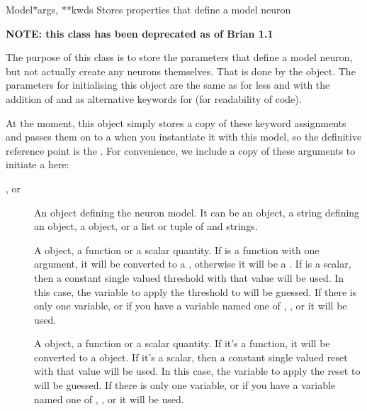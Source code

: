 \documentclass[letterpaper,10pt,english]{manual}
\begin{document}
\hypertarget{brian.Model}{}\begin{classdesc}{Model}{*args, **kwds}
Stores properties that define a model neuron

\textbf{NOTE: this class has been deprecated as of Brian 1.1}

The purpose of this class is to store the parameters that define
a model neuron, but not actually create any neurons themselves. That is
done by the \hyperlink{brian.NeuronGroup}{} object. The parameters for initialising
this object are the same as for \hyperlink{brian.NeuronGroup}{} less  and
with the addition of  and  as
alternative keywords for  (for readability of code).

At the moment, this object simply stores a copy of these keyword
assignments and passes them on to a \hyperlink{brian.NeuronGroup}{} when you
instantiate it with this model, so the definitive reference point is
the \hyperlink{brian.NeuronGroup}{}. For convenience, we include a copy of these
arguments to initiate a \hyperlink{brian.Model}{} here:
\begin{description}
\item[,  or ] \leavevmode
An object defining the neuron model. It can be
an \hyperlink{brian.Equations}{} object, a string defining an \hyperlink{brian.Equations}{} object,
a  object, or a list or tuple of \hyperlink{brian.Equations}{} and
strings.

\item[] \leavevmode
A \hyperlink{brian.Threshold}{} object, a function or a scalar quantity.
If  is a function with one argument, it will be
converted to a \hyperlink{brian.SimpleFunThreshold}{}, otherwise it will be a
\hyperlink{brian.FunThreshold}{}. If  is a scalar, then a constant
single valued threshold with that value will be used. In this case,
the variable to apply the threshold to will be guessed. If there is
only one variable, or if you have a variable named one of
, ,  or  it will be used.

\item[] \leavevmode
A \hyperlink{brian.Reset}{} object, a function or a scalar quantity. If it's a
function, it will be converted to a \hyperlink{brian.FunReset}{} object. If it's
a scalar, then a constant single valued reset with that value will
be used. In this case,
the variable to apply the reset to will be guessed. If there is
only one variable, or if you have a variable named one of
, ,  or  it will be used.


\end{description}
\end{classdesc}
\end{document}
